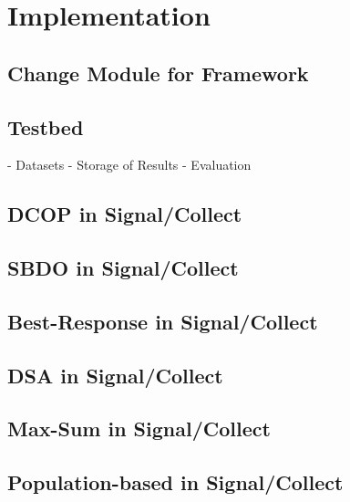 \chapter{Implementation}
\section{Change Module for Framework}
\section{Testbed}

- Datasets
- Storage of Results
- Evaluation

\section{DCOP in Signal/Collect}
\section{SBDO in Signal/Collect}
\section{Best-Response in Signal/Collect}
\section{DSA in Signal/Collect}
\section{Max-Sum in Signal/Collect}
\section{Population-based in Signal/Collect}